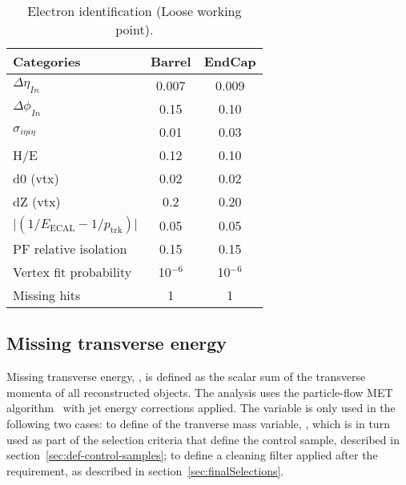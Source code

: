 \begin{table}[h!]
  \caption{Electron identification (Loose working point).\label{tab:ele-id}}
  \centering
  \footnotesize
  \begin{tabular}{ lcc }
    \hline
    \hline
    Categories                                               & Barrel    & EndCap    \\
    \hline
    $\Delta \eta_{In}$                                       & 0.007     & 0.009     \\
    $\Delta \phi_{In}$                                       & 0.15      & 0.10      \\
    $\sigma_{i\eta i\eta}$                                   & 0.01      & 0.03      \\
    H/E                                                      & 0.12      & 0.10      \\
    d0 (vtx)                                                 & 0.02      & 0.02      \\
    dZ (vtx)                                                 & 0.2       & 0.20      \\
    $\lvert(1/E_{\textrm{ECAL}} - 1/p_{\textrm{trk}})\rvert$ & 0.05      & 0.05      \\
    PF relative isolation                                    & 0.15      & 0.15      \\
    Vertex fit probability                                   & 10$^{-6}$ & 10$^{-6}$ \\
    Missing hits                                             & 1         & 1         \\
    \hline
    \hline
  \end{tabular}
\end{table}


\subsection{Missing transverse energy\label{recMET}}

Missing transverse energy, \met, is defined as the scalar sum of the transverse momenta 
of all reconstructed objects. The analysis uses the particle-flow MET 
algorithm~\cite{ref:MET-corrections} with jet energy corrections applied. 
The \met variable is only used in the following two cases: to define of the tranverse mass 
variable, \mt, which is in turn used as part of the selection criteria that define the 
\mj control sample, described in section~\ref{sec:def-control-samples}; to define a 
cleaning filter applied after the \alphat requirement, as described in 
section~\ref{sec:finalSelections}.

